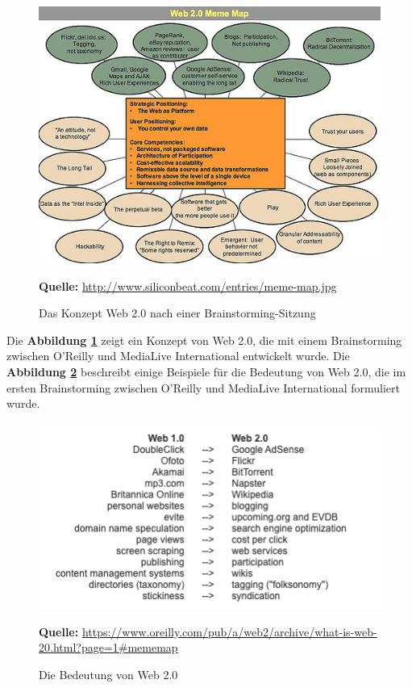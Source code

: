 \begin{figure}[H]
  \begin{center}
    \includegraphics[scale=0.6]{img/web2_map.jpg}
	\caption{Das Konzept Web 2.0 nach einer Brainstorming-Sitzung}
	\footnotesize\sffamily\textbf{Quelle:} \url{http://www.siliconbeat.com/entries/meme-map.jpg} 
	\label{fig:web2_map}
  \end{center}   
\end{figure}

\newpage
Die \textbf{Abbildung \ref{fig:web2_map}} zeigt ein Konzept von Web 2.0, die mit einem Brainstorming zwischen O’Reilly und MediaLive International entwickelt wurde. Die \textbf{Abbildung \ref{fig:Web1vsWeb2}} beschreibt einige Beispiele für die Bedeutung von Web 2.0, die im ersten Brainstorming zwischen O’Reilly und MediaLive International formuliert wurde.

\begin{figure}[H]
  \begin{center}
    \includegraphics[scale=0.7]{img/web1_vs_web2}
	\caption{Die Bedeutung von Web 2.0}
	\footnotesize\sffamily\textbf{Quelle:} \url{https://www.oreilly.com/pub/a/web2/archive/what-is-web-20.html?page=1#mememap} 
	\label{fig:Web1vsWeb2}
  \end{center}   
\end{figure}

